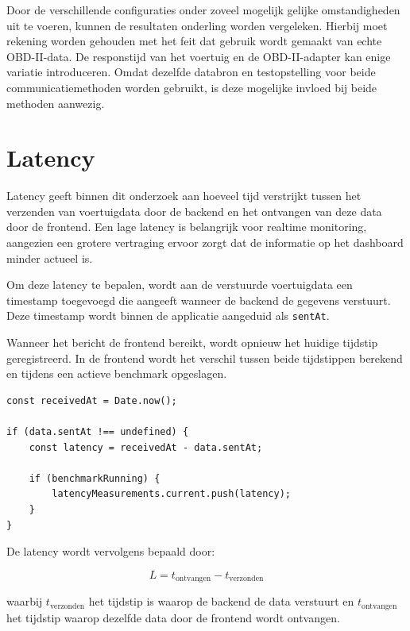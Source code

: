 Door de verschillende configuraties onder zoveel mogelijk gelijke
omstandigheden uit te voeren, kunnen de resultaten onderling worden vergeleken.
Hierbij moet rekening worden gehouden met het feit dat gebruik wordt gemaakt
van echte OBD-II-data. De responstijd van het voertuig en de OBD-II-adapter kan
enige variatie introduceren. Omdat dezelfde databron en testopstelling voor
beide communicatiemethoden worden gebruikt, is deze mogelijke invloed bij
beide methoden aanwezig.


\section{Latency}

Latency geeft binnen dit onderzoek aan hoeveel tijd verstrijkt tussen het
verzenden van voertuigdata door de backend en het ontvangen van deze data door
de frontend. Een lage latency is belangrijk voor realtime monitoring, aangezien
een grotere vertraging ervoor zorgt dat de informatie op het dashboard minder
actueel is.

Om deze latency te bepalen, wordt aan de verstuurde voertuigdata een timestamp
toegevoegd die aangeeft wanneer de backend de gegevens verstuurt. Deze timestamp
wordt binnen de applicatie aangeduid als \texttt{sentAt}.

Wanneer het bericht de frontend bereikt, wordt opnieuw het huidige tijdstip
geregistreerd. In de frontend wordt het verschil tussen beide tijdstippen
berekend en tijdens een actieve benchmark opgeslagen.

\begin{listing}[H]
\begin{verbatim}
const receivedAt = Date.now();

if (data.sentAt !== undefined) {
    const latency = receivedAt - data.sentAt;

    if (benchmarkRunning) {
        latencyMeasurements.current.push(latency);
    }
}
\end{verbatim}
\caption{Meten en opslaan van de latency in de frontend}
\label{lst:latency-meting}
\end{listing}

De latency wordt vervolgens bepaald door:

\begin{equation}
    L = t_{\text{ontvangen}} - t_{\text{verzonden}}
\end{equation}

waarbij $t_{\text{verzonden}}$ het tijdstip is waarop de backend de data
verstuurt en $t_{\text{ontvangen}}$ het tijdstip waarop dezelfde data door de
frontend wordt ontvangen.

